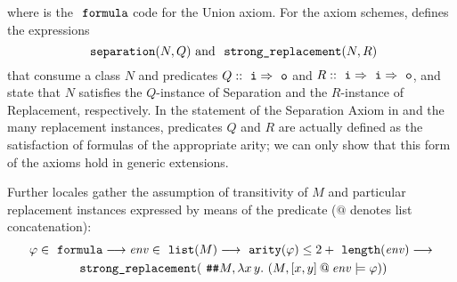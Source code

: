 where  is the $\formula$ code for the
Union axiom. For the axiom schemes,  defines
the expressions
\[
  \isatt{separation}(N,Q)
  \text{ and }
  \isatt{strong{\uscore}replacement}(N,R)
\]
that consume a class $N$ and predicates $Q::\tyi\fun\tyo$ and $R::\tyi\fun\tyi\fun\tyo$, and state that $N$
satisfies the $Q$-instance of Separation and the $R$-instance of
Replacement, respectively. In the statement of the Separation Axiom in
 and
the many replacement instances, predicates $Q$ and $R$ are actually
defined as the satisfaction of formulas of the appropriate arity; we can only show
that this form of the axioms hold in generic extensions. 

Further locales gather the assumption of transitivity of $M$ and
particular replacement instances expressed by means of the
 predicate ($@$ denotes
list concatenation):
\begin{multline}\label{eq:replacement_assm_def}
\varphi \in \formula  \limp \mathit{env} \in \isatt{list}(M) \limp \isatt{arity}(\varphi) \leq 2+ \isatt{length}(\mathit{env}) \limp \\
 \isatt{strong{\uscore}replacement}(\isatt{\#\#} M, \lambda x\, y.\ (M, [x,y]
\mathbin{@} \mathit{env}  \models \varphi))
\end{multline}
%
